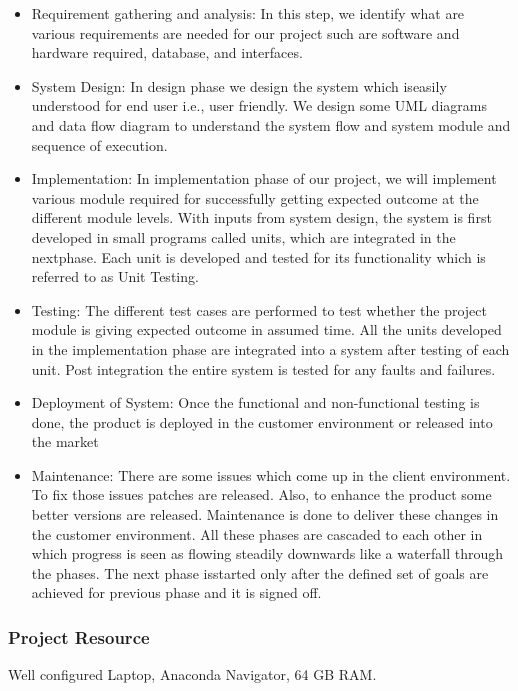 \documentclass[12pt]{report}
\begin{document}
\begin{itemize}\item Requirement gathering and analysis: In this step, we identify what are various 
requirements are needed for our project such are software and hardware required, 
database, and interfaces.

\item System Design: In design phase we design the system which iseasily understood for 
end user i.e., user friendly. We design some UML diagrams and data flow diagram to 
understand the system flow and system module and sequence of execution.

\item Implementation: In implementation phase of our project, we will implement various 
module required for successfully getting expected outcome at the different module 
levels. With inputs from system design, the system is first developed in small programs
called units, which are integrated in the nextphase. Each unit is developed and tested
for its functionality which is referred to as Unit Testing.

\item Testing: The different test cases are performed to test whether the project module is
giving expected outcome in assumed time. All the units developed in the
implementation phase are integrated into a system after testing of each unit. Post 
integration the entire system is tested for any faults and failures.

\item Deployment of System: Once the functional and non-functional testing is done, the
product is deployed in the customer environment or released into the market

\item Maintenance: There are some issues which come up in the client environment. To fix 
those issues patches are released. Also, to enhance the product some better versions are 
released. Maintenance is done to deliver these changes in the customer environment. All 
these phases are cascaded to each other in which progress is seen as flowing steadily 
downwards like a waterfall through the phases. The next phase isstarted only after the 
defined set of goals are achieved for previous phase and it is signed off.



\end{itemize}
\centering
\raggedright
\subsubsection{Project Resource}
Well configured Laptop, Anaconda Navigator, 64 GB RAM.
\clearpage
\centering
\raggedright
\end{document}
